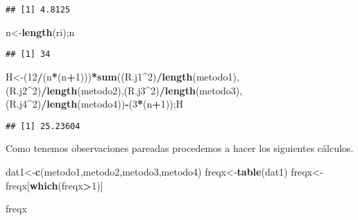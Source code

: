 \documentclass[
]{article}
\newenvironment{Shaded}{\begin{snugshade}}{\end{snugshade}}
\newcommand{\DecValTok}[1]{\textcolor[rgb]{0.00,0.00,0.81}{#1}}
\newcommand{\FunctionTok}[1]{\textcolor[rgb]{0.13,0.29,0.53}{\textbf{#1}}}
\newcommand{\NormalTok}[1]{#1}
\newcommand{\OtherTok}[1]{\textcolor[rgb]{0.56,0.35,0.01}{#1}}
\newcommand{\SpecialCharTok}[1]{\textcolor[rgb]{0.81,0.36,0.00}{\textbf{#1}}}
\begin{document}
\begin{verbatim}
## [1] 4.8125
\end{verbatim}

\begin{Shaded}
\begin{Highlighting}[]
\NormalTok{n}\OtherTok{\textless{}{-}}\FunctionTok{length}\NormalTok{(ri);n}
\end{Highlighting}
\end{Shaded}

\begin{verbatim}
## [1] 34
\end{verbatim}

\begin{Shaded}
\begin{Highlighting}[]
\NormalTok{H}\OtherTok{\textless{}{-}}\NormalTok{(}\DecValTok{12}\SpecialCharTok{/}\NormalTok{(n}\SpecialCharTok{*}\NormalTok{(n}\SpecialCharTok{+}\DecValTok{1}\NormalTok{)))}\SpecialCharTok{*}\FunctionTok{sum}\NormalTok{((R.j1}\SpecialCharTok{\^{}}\DecValTok{2}\NormalTok{)}\SpecialCharTok{/}\FunctionTok{length}\NormalTok{(metodo1),(R.j2}\SpecialCharTok{\^{}}\DecValTok{2}\NormalTok{)}\SpecialCharTok{/}\FunctionTok{length}\NormalTok{(metodo2),(R.j3}\SpecialCharTok{\^{}}\DecValTok{2}\NormalTok{)}\SpecialCharTok{/}\FunctionTok{length}\NormalTok{(metodo3), (R.j4}\SpecialCharTok{\^{}}\DecValTok{2}\NormalTok{)}\SpecialCharTok{/}\FunctionTok{length}\NormalTok{(metodo4))}\SpecialCharTok{{-}}\NormalTok{(}\DecValTok{3}\SpecialCharTok{*}\NormalTok{(n}\SpecialCharTok{+}\DecValTok{1}\NormalTok{));H}
\end{Highlighting}
\end{Shaded}

\begin{verbatim}
## [1] 25.23604
\end{verbatim}

Como tenemos observaciones pareadas procedemos a hacer los siguientes
cálculos.

\begin{Shaded}
\begin{Highlighting}[]
\NormalTok{dat1}\OtherTok{\textless{}{-}}\FunctionTok{c}\NormalTok{(metodo1,metodo2,metodo3,metodo4)}
\NormalTok{freqx}\OtherTok{\textless{}{-}}\FunctionTok{table}\NormalTok{(dat1)}
\NormalTok{freqx}\OtherTok{\textless{}{-}}\NormalTok{freqx[}\FunctionTok{which}\NormalTok{(freqx}\SpecialCharTok{\textgreater{}}\DecValTok{1}\NormalTok{)]}

\NormalTok{freqx}
\end{Highlighting}
\end{Shaded}
\end{document}
